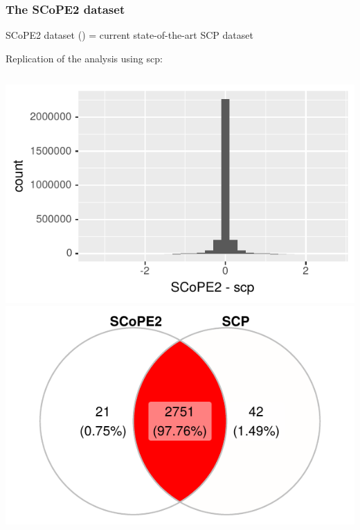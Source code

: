 \documentclass{beamer}
\newcommand{\hcode}[2][lgray]{{\ttfamily\color{vdgray}\colorbox{#1}{#2}}}
\begin{document}
\begin{frame}[allowframebreaks]
  \frametitle{The SCoPE2 dataset}
  
  \vfill
  SCoPE2 dataset  {\footnotesize(\cite{Specht2020-jm})} = current 
  state-of-the-art SCP dataset 

  \vfill
  Replication of the analysis using \hcode{scp}:

  \vfill
  \begin{columns}
    \includegraphics[width=\linewidth]{figs/Benchmark_prot_err.pdf}
    \includegraphics[width=\linewidth]{figs/Benchmark_prot_venn.pdf}
  \end{columns}
  
  \framebreak
  

\end{frame}
\end{document}
